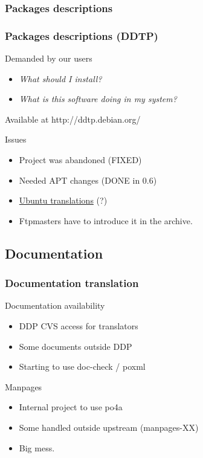 \documentclass{beamer}
\begin{document}
\subsubsection{Packages descriptions}

\begin{frame}
  \frametitle{Packages descriptions (DDTP)}
	\begin{block}
		{Demanded by our users}
		\begin{itemize}
		\item {\em What should I install?}
		\item {\em What is this software doing in my system?}
		\end{itemize}
	\end{block}
	\begin{block}
		{Available at http://ddtp.debian.org/}
	\end{block}
	\begin{block}
		{Issues}
		\begin{itemize}
		\item Project was abandoned (FIXED)
		\item Needed APT changes (DONE in 0.6)
		\item \href{https://launchpad.net/products/ddtp-ubuntu/+translations}{Ubuntu translations} (?)
		\item Ftpmasters have to introduce it in the archive.
		\end{itemize}
	\end{block}
\end{frame}



\subsection{Documentation}

\begin{frame}
  \frametitle{Documentation translation}
	\begin{block}
		{Documentation availability}
		\begin{itemize}
		\item DDP CVS access for translators
		\item Some documents outside DDP
		\item Starting to use doc-check / poxml
		\end{itemize}
	\end{block}
	\begin{block}
		{Manpages}
		\begin{itemize}
		\item Internal project to use po4a
		\item Some handled outside upstream (manpages-XX)
		\item Big mess.
		\end{itemize}
	\end{block}
\end{frame}
\end{document}
